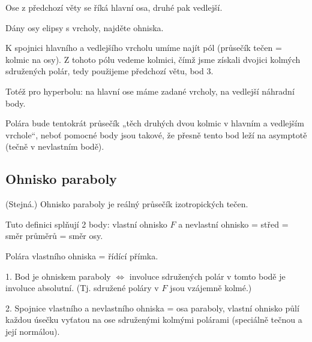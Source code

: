 \documentclass[12pt]{article}					%
\begin{document}
\begin{definice}
	Ose z předchozí věty se říká hlavní osa, druhé pak vedlejší.
\end{definice}

\begin{priklad}[Konstrukce]
	Dány osy elipsy s vrcholy, najděte ohniska.

	\begin{reseni}
		K spojnici hlavního a vedlejšího vrcholu umíme najít pól (průsečík tečen = kolmic na osy). Z tohoto pólu vedeme kolmici, čímž jsme získali dvojici kolmých sdružených polár, tedy použijeme předchozí větu, bod 3.
	\end{reseni}

	Totéž pro hyperbolu: na hlavní ose máme zadané vrcholy, na vedlejší náhradní body.

	\begin{reseni}
		Polára bude tentokrát průsečík „těch druhých dvou kolmic v hlavním a vedlejším vrchole“, neboť pomocné body jsou takové, že přesně tento bod leží na asymptotě (tečně v nevlastním bodě).
	\end{reseni}
\end{priklad}

\subsection{Ohnisko paraboly}
\begin{definice}[Ohnisko]
	(Stejná.) Ohnisko paraboly je reálný průsečík izotropických tečen.

	\begin{poznamkain}
		Tuto definici splňují 2 body: vlastní ohnisko $F$ a nevlastní ohnisko = střed = směr průměrů = směr osy.
	\end{poznamkain}

	\begin{poznamkain}
		Polára vlastního ohniska = řídící přímka.
	\end{poznamkain}
\end{definice}

\begin{veta}
	1. Bod je ohniskem paraboly $\Leftrightarrow$ involuce sdružených polár v tomto bodě je involuce absolutní. (Tj. sdružené poláry v $F$ jsou vzájemně kolmé.)

	2. Spojnice vlastního a nevlastního ohniska = osa paraboly, vlastní ohnisko půlí každou úsečku vyťatou na ose sdruženými kolmými polárami (speciálně tečnou a její normálou).
\end{veta}
\end{document}
